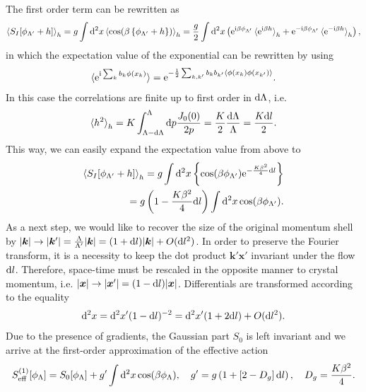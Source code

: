 The first order term can be rewritten as
\begin{align}
    \braket{S_I[\phi_{\Lambda'}+h]}_h = g\int\mathrm d^2x\braket{\cos(\beta\left\{ \phi_{\Lambda'}+h \right\})}_h
    = \frac g2\int\mathrm d^2x\left( \mathrm e^{\mathrm i\beta \phi_{\Lambda'}}\braket{\mathrm e^{\mathrm i\beta h}}_h+\mathrm e^{-\mathrm i\beta \phi_{\Lambda'}}\braket{\mathrm e^{-\mathrm i\beta h}}_h \right),
\end{align}
in which the expectation value of the exponential can be rewritten by using
\begin{align}
    \braket{\mathrm e^{\mathrm i\sum_kb_k\phi(x_k)}} = \mathrm e^{-\frac12\sum_{k,k'}b_kb_{k'}\braket{\phi(x_k)\phi(x_{k'})}}.
    \label{eq:expectation_value_exponential_fields}
\end{align}
In this case the correlations are finite up to first order in $\mathrm d\Lambda$, i.e.
\begin{align}
    \braket{h^2}_h = K\int_{\Lambda-\mathrm d\Lambda}^\Lambda\mathrm d p\frac{J_0(0)}{2p} = \frac K2\frac{\mathrm d\Lambda}\Lambda = \frac{K\mathrm d l}2.
    \label{eq:rg_hsq}
\end{align}
This way, we can easily expand the expectation value from above to
\begin{align}
    \braket{S_I[\phi_{\Lambda'}+h]}_h
    = g\int\mathrm d^2x\left\{ \cos(\beta \phi_{\Lambda'})\mathrm e^{-\frac{K\beta^2}4\mathrm d l} \right\}
    \\
    = g\left( 1 - \frac{K\beta^2}4\mathrm d l \right)\int\mathrm d^2x\cos(\beta \phi_{\Lambda'}).
\end{align}
As a next step, we would like to recover the size of the original momentum shell by $|{\bm k}|\rightarrow |{\bm k}'|=\frac{\Lambda}{\Lambda'}|{\bm k}| = (1+\mathrm d l)|{\bm k}|+O(\mathrm d l^2)$.
In order to preserve the Fourier transform, it is a necessity to keep the dot product ${\bm k'}{\bm x'}$ invariant under the flow $\mathrm d l$.
Therefore, space-time must be rescaled in the opposite manner to crystal momentum, i.e. $|{\bm x}|\rightarrow|{\bm x'}|=(1-\mathrm d l)|{\bm x}|$.
Differentials are transformed according to the equality
\begin{align}
    \mathrm d^2x = \mathrm d^2 x'(1-\mathrm d l)^{-2} = \mathrm d^2 x'(1+2\mathrm d l) + O(\mathrm d l^2).
\end{align}
Due to the presence of gradients, the Gaussian part $S_0$ is left invariant and we arrive at the first-order approximation of the effective action
\begin{align}
    S^{(1)}_{\rm eff}[\phi_\Lambda]=S_0[\phi_\Lambda] + g'\int\mathrm d^2x\cos(\beta \phi_{\Lambda}),
    \quad
    g' = g\left( 1 + \left[ 2-D_g \right]\mathrm d l \right),
    \quad
    D_g=\frac{K\beta^2}4.
    \label{eq:bkt_first_order}
\end{align}
